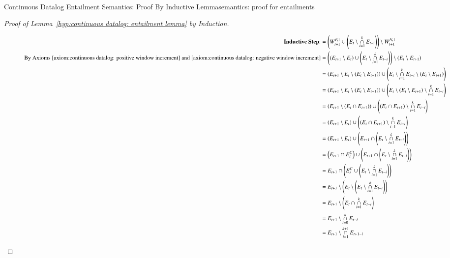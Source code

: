 \begin{nestedsection}{Continuous Datalog Entailment Semantics: Proof By Inductive Lemma}{semantics: proof for entailments}
\begin{proof}[Proof of Lemma~\ref{hyp:continuous datalog: entailment lemma} by Induction]
\begin{figure}[p]
\begin{align*}
				\text{\textbf{Inductive Step}:}& = \left( W^{P,1}_{t+1} \cup \left( E_t \setminus \mathop{\cap}^{k}_{i=1} E_{t-i} \right) \right) \setminus W^{N,1}_{t+1} \\
				\text{By Axioms~\ref{axiom:continuous datalog: positive window increment}~and~\ref{axiom:continuous datalog: negative window increment}} & = \left( \left( E_{t+1} \setminus E_{t} \right) \cup \left( E_t \setminus \mathop{\cap}^{k}_{i=1} E_{t-i} \right) \right) \setminus \left( E_{t} \setminus E_{t+1} \right) \\
				& = \left( E_{t+1} \setminus E_{t} \setminus \left( E_{t} \setminus E_{t+1} \right) \right) \cup \left( E_t \setminus \mathop{\cap}^{k}_{i=1} E_{t-i} \setminus \left( E_{t} \setminus E_{t+1} \right) \right) \\
				& = \left( E_{t+1} \setminus E_{t} \setminus \left( E_{t} \setminus E_{t+1} \right) \right) \cup \left( E_t \setminus \left( E_{t} \setminus E_{t+1} \right) \setminus \mathop{\cap}^{k}_{i=1} E_{t-i} \right) \\
				& = \left( E_{t+1} \setminus \left( E_{t} \cap E_{t+1} \right) \right) \cup \left( \left( E_t \cap E_{t+1} \right) \setminus \mathop{\cap}^{k}_{i=1} E_{t-i} \right) \\
				& = \left( E_{t+1} \setminus E_{t} \right) \cup \left( \left( E_t \cap E_{t+1} \right) \setminus \mathop{\cap}^{k}_{i=1} E_{t-i} \right) \\
				& = \left( E_{t+1} \setminus E_{t} \right) \cup \left( E_{t+1} \cap \left( E_{t} \setminus \mathop{\cap}^{k}_{i=1} E_{t-i} \right) \right) \\
				& = \left( E_{t+1} \cap E^C_{t} \right) \cup \left( E_{t+1} \cap \left( E_{t} \setminus \mathop{\cap}^{k}_{i=1} E_{t-i} \right) \right)\\
				& = E_{t+1} \cap \left( E^C_{t} \cup \left( E_{t} \setminus \mathop{\cap}^{k}_{i=1} E_{t-i} \right) \right) \\
				& = E_{t+1} \setminus \left( E_{t} \setminus \left( E_{t} \setminus \mathop{\cap}^{k}_{i=1} E_{t-i} \right) \right) \\
				& = E_{t+1} \setminus \left( E_{t} \cap \mathop{\cap}^{k}_{i=1} E_{t-i} \right) \\
				& = E_{t+1} \setminus \mathop{\cap}^{k}_{i=0} E_{t-i} \\
				& = E_{t+1} \setminus \mathop{\cap}^{k+1}_{i=1} E_{t+1-i}
			\end{align*}
		\end{figure}
	\end{proof}
\end{nestedsection}